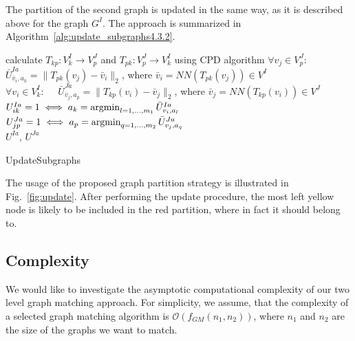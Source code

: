The partition of the second graph is updated in the same way, as it is described above for the graph $G^I$. The approach is summarized in Algorithm~\ref{alg:update_subgraphs4.3.2}.

\begin{algorithm}[h]
	{
		calculate $T_{kp}:V^I_k\rightarrow V^J_p$ and $T_{pk}:V^J_p\rightarrow V^I_k$ using CPD algorithm
	}
	{
		$\forall v_j\in V^J_p:\quad$ $\bar{U}^{Ia}_{\bar{v}_i,a_k}=\|T_{pk}(v_j)-\bar{v}_i\|_2$, where $\bar{v}_i=NN(T_{pk}(v_j))\in V^I$\\
		$\forall v_i\in V^I_k:\quad$ $\bar{U}^{Ja}_{\bar{v}_j,a_p}=\|T_{kp}(v_i)-\bar{v}_j\|_2$, where $\bar{v}_j=NN(T_{kp}(v_i))\in V^J$
	}
	$U^{Ia}_{ik}=1 \iff a_k=\mathop{\rm argmin}_{l=1,\dots,m_1}^{}{\bar{U}^{Ia}_{v_i,a_l}}$\\
	$U^{Ja}_{jp}=1 \iff a_p=\mathop{\rm argmin}_{q=1,\dots,m_2}^{}{\bar{U}^{Ja}_{v_j,a_q}}$\\
	\Return $U^{Ia}$, $U^{Ja}$
	
	\caption{UpdateSubgraphs}    \label{alg:update_subgraphs4.3.2}
\end{algorithm}

The usage of the proposed graph partition strategy is illustrated in Fig.~\ref{fig:update}. After performing the update procedure, the most left yellow node is likely to be included in the red partition, where in fact it should belong to.
\FloatBarrier
\subsection{Complexity}
We would like to investigate the asymptotic computational complexity of our two level graph matching approach. For simplicity, we assume, that the complexity of a selected graph matching algorithm is $\mathcal{O}(f_{GM}(n_1,n_2))$, where $n_1$ and $n_2$ are the size of the graphs we want to match.

